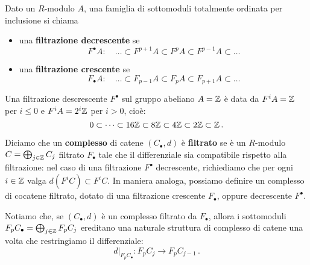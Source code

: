 \begin{df}
	Dato un $R$-modulo $A$, una famiglia di sottomoduli 
	totalmente ordinata per inclusione si chiama
	\begin{itemize}
		\item una \textbf{filtrazione decrescente} se 
			\begin{equation*}
				F^{\bullet}A : \quad
				\dots \subset F^{p+1}A \subset F^{p}A \subset F^{p-1}A \subset \dots
			\end{equation*}
			
		\item una \textbf{filtrazione crescente} se 
			\begin{equation*}
				F_{\bullet}A : \quad
				\dots \subset F_{p-1}A \subset F_{p}A \subset F_{p+1}A \subset \dots
			\end{equation*}
	\end{itemize}
\end{df}


\begin{ex}
	Una filtrazione descrescente $F^{\bullet}$ sul gruppo abeliano $A = {\mathbb Z}$ è data da
	$F^{i}A = {\mathbb Z}$ per $i \le 0$ e $F^{i}A = 2^{i}{\mathbb Z}$ per $i > 0$, cioè:
	\begin{equation*}
		0 \subset \dots \subset 16{\mathbb Z} \subset 8{\mathbb Z} \subset 4{\mathbb Z} \subset 2{\mathbb Z} \subset {\mathbb Z}\,.
	\end{equation*}
\end{ex}


\begin{df}
	Diciamo che un \textbf{complesso} di catene $(C_{\bullet}, d)$ è \textbf{filtrato}
	se è un $R$-modulo $C = \bigoplus_{j \in {\mathbb Z}} C_{j}$ filtrato $F_{\bullet}$ tale
	che il differenziale sia compatibile rispetto alla filtrazione: 
	nel caso di una filtrazione $F^{\bullet}$ decrescente,
	richiediamo che per ogni $i \in {\mathbb Z}$ valga
	 $d\left(F^{i}C\right) \subset F^{i}C$.
	 In maniera analoga, possiamo definire un complesso di cocatene filtrato,
	 dotato di una filtrazione crescente $F_{\bullet}$, 
	 oppure decrescente $F^{\bullet}$.
\end{df}

	Notiamo che, se $(C_{\bullet},d)$ è un complesso filtrato da $F_{\bullet}$,
	allora i sottomoduli $F_{p}C_{\bullet}=\bigoplus_{j \in {\mathbb Z}}F_{p}C_{j}$
	ereditano una naturale struttura di complesso di catene
	una volta che restringiamo il differenziale:
	\begin{equation*}
		d\vert_{F_{p}C_{\bullet}} : F_{p}C_{j} \longrightarrow F_{p}C_{j-1}\,.
	\end{equation*}

